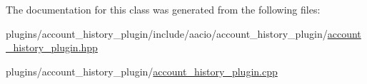 The documentation for this class was generated from the following files\+:\begin{DoxyCompactItemize}
\item 
plugins/account\+\_\+history\+\_\+plugin/include/aacio/account\+\_\+history\+\_\+plugin/\mbox{\hyperlink{account__history__plugin_8hpp}{account\+\_\+history\+\_\+plugin.\+hpp}}\item 
plugins/account\+\_\+history\+\_\+plugin/\mbox{\hyperlink{account__history__plugin_8cpp}{account\+\_\+history\+\_\+plugin.\+cpp}}\end{DoxyCompactItemize}
